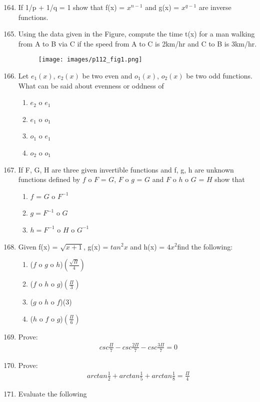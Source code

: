 \documentclass[11pt]{amsbook}
\begin{document}
\begin{enumerate}
\setcounter {enumi} {163}
\item If 1/p + 1/q = 1 show that f(x) = $x^{n-1}$ and g(x) = $x^{q-1}$ are inverse functions.
\item Using the data given in the Figure, compute the time t(x) for a man walking from A to B via C 
if the speed from A to C is 2km/hr and C to B is 3km/hr.
\begin{figure} [h]
\begin{center}
\texttt{[image: images/p112\_fig1.png]}
\label{fig:p112_fig1}
\caption{}

\end{center}
\end{figure}
\item Let $e_{1}(x)$, $e_{2}(x)$ be two even and $o_{1}(x)$, $o_{2}(x)$ be two odd functions.
What can be said about  evenness or oddness of
\renewcommand{\theenumi}{\Alph{enumi}}
\begin{enumerate}
\item $e_{2}$ o $e_{1}$  \item $e_{1}$ o $o_{1}$ 
\item $o_{1}$ o $e_{1}$ \item $o_{2}$ o $o_{1}$
\end{enumerate}

\item If F, G, H are three given invertible functions and f, g, h are unknown functions defined by $f$ o $F$ = $G$,
$F$ o $g$ = $G$ and $F$ o $h$ o $G$ = $H$ show that
\begin{enumerate}
\renewcommand{\theenumi}{\Alph{enumi}}
\item $f$ =  $G$ o $F^{-1}$ \item $g = F^{-1}$ o $G$
\item $h = F^{-1}$ o $H$ o $G^{-1}$
\end{enumerate}
\item Given f(x) = $\sqrt{x+1}$, g(x) = $tan^{2}x$ and h(x) = $4x^{2}$find the following:
\begin{enumerate}
\renewcommand{\theenumi}{\Alph{enumi}}
\item ($f$ o $g$ o $h$)$(\frac{\sqrt{\varPi}}{4})$ \item ($f$ o $h$ o $g$)$(\frac{\varPi}{3})$
\item ($g$ o $h$ o $f$)(3) \item ($h$ o $f$ o $g$)$(\frac{\varPi}{6})$
\end{enumerate}
\item Prove:
\begin{gather*}
csc  \frac{\varPi} {7} - csc \frac{2\varPi}{7} - csc \frac{3\varPi}{7} = 0
\end{gather*}
\item Prove:
\begin{gather*}
arctan \frac{1}{2} + arctan \frac{1}{5} + arctan \frac{1}{8} = \frac{\varPi}{4}
\end{gather*}
\item Evaluate the following
\end{enumerate}
\end{document}
